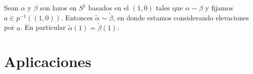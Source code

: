 \documentclass[GTSResumen.tex]{subfiles}
\begin{document}
\begin{coro}
Sean $\alpha$ y $\beta$ son lazos en $S^1$ basados en el $(1,0)$ tales que $\alpha\sim \beta$ y fijamos $a\in p^{-1}((1,0))$. Entonces $\tilde{\alpha}\sim\tilde{\beta}$, en donde estamos considerando elevaciones por $a$. En particular $\tilde{\alpha}(1)=\tilde{\beta}(1)$.
\end{coro}

\section{Aplicaciones}
\end{document}
